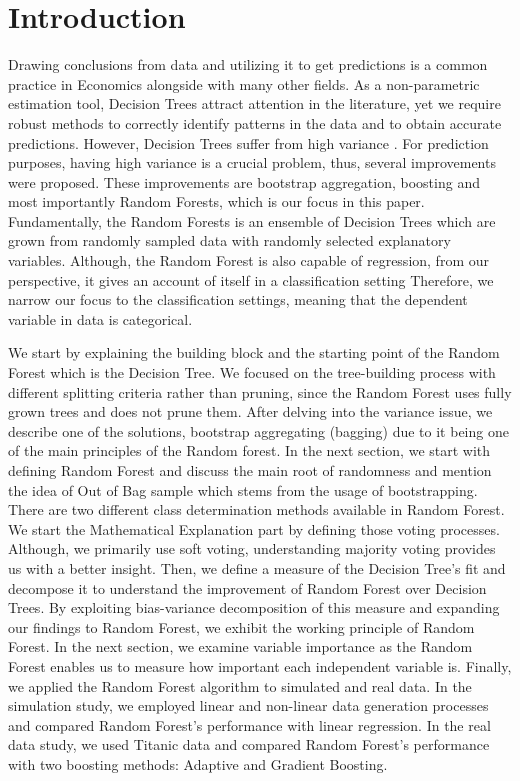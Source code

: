 \section{Introduction}
\label{ch:intro}

Drawing conclusions from data and utilizing it to get predictions is a common 
practice in Economics alongside with many other fields. 
As a non-parametric estimation tool, Decision Trees attract attention in the literature,
yet we require robust methods to correctly identify patterns in the data and to obtain accurate predictions.
However, Decision Trees suffer from high variance \cite{friedman2001elements}. 
For prediction purposes, having high variance is a crucial problem, thus, several improvements were proposed.
These improvements are bootstrap aggregation, boosting and most importantly Random Forests, which is our focus in this paper. 
Fundamentally, the Random Forests is an ensemble of Decision Trees which are grown from randomly sampled data with 
randomly selected explanatory variables. 
Although, the Random Forest is also capable of regression, 
from our perspective, it gives an account of itself in a classification setting 
Therefore, we narrow our focus to the classification settings, 
meaning that the dependent variable in data is categorical.


We start by explaining the building block and the starting point of the Random Forest which is the Decision Tree.
We focused on the tree-building process with different splitting criteria rather than pruning, since
the Random Forest uses fully grown trees and does not prune them.
After delving into the variance issue, we describe one of the solutions, bootstrap aggregating (bagging) 
due to it being one of the main principles of the Random forest.
In the next section, we start with defining Random Forest 
and discuss the main root of randomness and mention the idea of 
Out of Bag sample which stems from the usage of bootstrapping.
There are two different class determination methods available in Random Forest. 
We start the Mathematical Explanation part by defining those voting processes. 
Although, we primarily use soft voting, understanding majority voting provides us with a better insight.
Then, we define a measure of the Decision Tree's fit and decompose it to 
understand the improvement of Random Forest over Decision Trees.
By exploiting bias-variance decomposition of this measure and expanding our findings to Random Forest, 
we exhibit the working principle of Random Forest.
In the next section, we examine variable importance as the Random Forest enables us to measure 
how important each independent variable is.
Finally, we applied the Random Forest algorithm to simulated and real data.
In the simulation study, we employed linear and non-linear data generation processes 
and compared Random Forest's performance with linear regression.
In the real data study, we used Titanic data \cite{titanicData} 
and compared Random Forest's performance with two boosting methods: Adaptive and Gradient Boosting.

